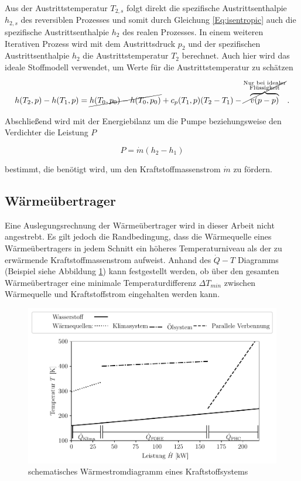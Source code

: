 Aus der Austrittstemperatur $T_{2,s}$ folgt direkt die spezifische Austrittsenthalpie $h_{2,s}$ des reversiblen Prozesses und somit durch Gleichung \ref{Eq:isentropic} auch die spezifische Austrittsenthalpie $h_2$ des realen Prozesses. In einem weiteren Iterativen Prozess wird mit dem Austrittsdruck $p_2$ und der spezifischen Austrittsenthalpie $h_2$ die Austrittstemperatur $T_2$ berechnet. Auch hier wird das ideale Stoffmodell verwendet, um Werte für die Austrittstemperatur zu schätzen

\begin{equation}\label{Eq:enthalpy}
	h(T_2,p)-h(T_1,p)=\cancel{h(T_0,p_0) - h(T_0,p_0)} + c_p(T_1,p)(T_2 - T_1) - {\cancel{\overbrace{v(p-p)}^{\substack{\text{Nur bei idealer} \\ \text{Flüssigkeit}}}}}\,.
\end{equation}

Abschließend wird mit der Energiebilanz um die Pumpe beziehungsweise den Verdichter die Leistung $P$ 

\begin{equation}\label{Eq:power}
	P=\dot{m}(h_2-h_1)
\end{equation}

bestimmt, die benötigt wird, um den Kraftstoffmassenstrom $\dot{m}$ zu fördern.

\subsection{Wärmeübertrager}

Eine Auslegungsrechnung der Wärmeübertrager wird in dieser Arbeit nicht angestrebt. Es gilt jedoch die Randbedingung, dass die Wärmequelle eines Wärmeübertragers in jedem Schnitt ein höheres Temperaturniveau als der zu erwärmende Kraftstoffmassenstrom aufweist. Anhand des $\dot{Q}-T$ Diagramms (Beispiel siehe Abbildung \ref{fig:hx}) kann festgestellt werden, ob über den gesamten Wärmeübertrager eine minimale Temperaturdifferenz $\Delta T_{min}$ zwischen Wärmequelle und Kraftstoffstrom eingehalten werden kann.


\begin{figure}[ht]
	\centering
	\includegraphics[width=1\linewidth]{4_Abbildungen/2_Hauptteil/hx.pdf}
	\caption{schematisches Wärmestromdiagramm eines Kraftstoffsystems}
	\label{fig:hx}
\end{figure}
\FloatBarrier 

